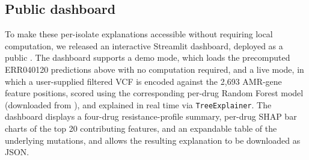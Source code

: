 

\subsection{Public dashboard}

To make these per-isolate explanations accessible without requiring local computation, we released an interactive Streamlit dashboard, deployed as a public . The dashboard supports a demo mode, which loads the precomputed ERR040120 predictions above with no computation required, and a live mode, in which a user-supplied filtered VCF is encoded against the 2{,}693 AMR-gene feature positions, scored using the corresponding per-drug Random Forest model (downloaded from ), and explained in real time via \texttt{TreeExplainer}. The dashboard displays a four-drug resistance-profile summary, per-drug SHAP bar charts of the top 20 contributing features, and an expandable table of the underlying mutations, and allows the resulting explanation to be downloaded as JSON.
